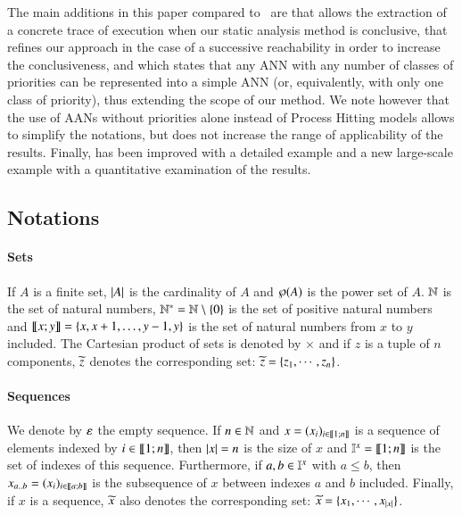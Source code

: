The main additions in this paper compared to~\cite{FPMR13-CS2Bio} are
 that allows the extraction of a concrete trace of execution
when our static analysis method is conclusive,
 that refines our approach in the case
of a successive reachability in order to increase the conclusiveness,
and  which states that any ANN
with any number of classes of priorities
can be represented into a simple ANN
(or, equivalently, with only one class of priority),
thus extending the scope of our method.
We note however that the use of AANs without priorities alone
instead of Process Hitting models
allows to simplify the notations, but does not increase
the range of applicability of the results.
Finally,  has been improved with a detailed example
and a new large-scale example with a quantitative examination of the results.



\subsection*{Notations}
\label{notations}

\paragraph*{Sets}
If $A$ is a finite set,
$|A|$ is the cardinality of $A$
and $\wp(A)$ is the power set of $A$.
$\mathbb{N}$ is the set of natural numbers,
$\mathbb{N}^* = \mathbb{N} \setminus \{ 0 \}$ is the set of positive natural numbers
and $\llbracket x; y \rrbracket = \{ x, x+1, \dots, y-1, y \}$ is the set of natural numbers from $x$ to $y$ included.
The Cartesian product of sets is denoted by $\times$ and
if $z$ is a tuple of $n$ components, $\widetilde{z}$ denotes the corresponding set:
$\widetilde{z} = \{z_1, \cdots, z_n\}$.

\paragraph*{Sequences}
We denote by $\varepsilon$ the empty sequence.
If $n \in \mathbb{N}$ and
$x = (x_i)_{i \in \llbracket 1; n \rrbracket}$ is a sequence of elements indexed by $i \in \llbracket 1; n \rrbracket$,
then $|x| = n$ is the size of $x$
and $\mathbb{I}^{x} = \llbracket 1; n \rrbracket$ is the set of indexes of this sequence.
Furthermore, if $a, b \in \mathbb{I}^{x}$ with $a \leq b$,
then $x_{a..b} = (x_i)_{i \in \llbracket a; b \rrbracket}$ is the subsequence of $x$
between indexes $a$ and $b$ included.
Finally, if $x$ is a sequence, $\widetilde{x}$ also denotes the corresponding set:
$\widetilde{x} = \{x_1, \cdots, x_{|x|}\}$.

